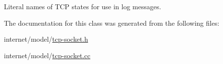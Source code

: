 Literal names of T\+CP states for use in log messages. 



The documentation for this class was generated from the following files\+:\begin{DoxyCompactItemize}
\item 
internet/model/\hyperlink{tcp-socket_8h}{tcp-\/socket.\+h}\item 
internet/model/\hyperlink{tcp-socket_8cc}{tcp-\/socket.\+cc}\end{DoxyCompactItemize}

